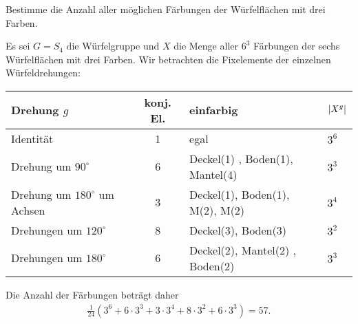 \documentclass[12pt,a4paper]{article}
\begin{document}
\begin{aufgabe}  
Bestimme die Anzahl aller möglichen Färbungen der Würfelflächen mit drei
Farben.
\end{aufgabe}

\begin{loesung}
Es sei $G=S_4$ die Würfelgruppe und $X$ die Menge aller $6^3 $ Färbungen der
sechs Würfelflächen mit drei Farben. Wir betrachten die Fixelemente der
einzelnen Würfeldrehungen:
\begin{center}
\begin{tabular}{|l||cl|l|}
\hline {\bf Drehung $g$} & {\bf konj. El.}  & {\bf einfarbig} & {\bf
  $\left\vert X^g\right\vert$} \\\hline\hline 
Identität & 1 & egal &$3^6$ \\ \hline 
Drehung um $90^\circ $ & 6 & Deckel(1) , Boden(1), Mantel(4) & $3^3$ \\\hline
Drehung um $180^\circ $ um Achsen & 3 & Deckel(1), Boden(1), M(2), M(2)& $3^4$
\\\hline Drehungen um $120^\circ$ & 8 & Deckel(3), Boden(3) & $3^2$\\\hline
Drehungen um $180^\circ $ & 6 & Deckel(2), Mantel(2) , Boden(2) & $3^3$
\\\hline\hline
\end{tabular}
\end{center}
Die Anzahl der Färbungen beträgt daher 
\begin{gather*}
  \frac{1}{24} \left( 3^6 +6\cdot 3^3 + 3\cdot 3^4 + 8\cdot 3^2 + 6\cdot
  3^3\right) =57.
\end{gather*}
\end{loesung}


\medskip
\end{document}
